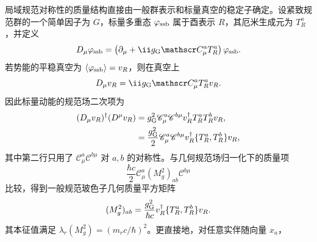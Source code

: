 局域规范对称性的质量结构直接由一般群表示和标量真空的稳定子确定。设紧致规范群的一个简单因子为 $G$，标量多重态 $\varphi_{\rm ssb}$ 属于酉表示 $R$，其厄米生成元为 $T_R^a$，并定义
\begin{equation}
 D_\mu\varphi_{\rm ssb}
 =\left(\partial_\mu+\ii g_{\rm G}\mathscr C_\mu^aT_R^a\right)\varphi_{\rm ssb}.
 \label{eq:general-ssb-covariant-derivative-dp73}
\end{equation}
若势能的平稳真空为 $\langle\varphi_{\rm ssb}\rangle=v_R$，则在真空上
\begin{equation*}
 D_\mu v_R=\ii g_{\rm G}\mathscr C_\mu^aT_R^av_R.
\end{equation*}
因此标量动能的规范场二次项为
\begin{align*}
 (D_\mu v_R)^\dagger(D^\mu v_R)
 &=g_{\rm G}^2\mathscr C_\mu^a\mathscr C^{b\mu}
 v_R^\dagger T_R^aT_R^bv_R,\\
 &=\frac{g_{\rm G}^2}{2}\mathscr C_\mu^a\mathscr C^{b\mu}
 v_R^\dagger\{T_R^a,T_R^b\}v_R,
\end{align*}
其中第二行只用了 $\mathscr C_\mu^a\mathscr C^{b\mu}$ 对 $a,b$ 的对称性。与几何规范场归一化下的质量项
\[
\frac{\hbar c}{2}\mathscr C_\mu^a(M_g^2)_{ab}\mathscr C^{b\mu}
\]
比较，得到一般规范玻色子几何质量平方矩阵
\begin{equation}
 {
 (M_g^2)_{ab}
 =\frac{g_{\rm G}^2}{\hbar c}
 v_R^\dagger\{T_R^a,T_R^b\}v_R.}
 \label{eq:general-gauge-boson-mass-matrix-dp11}
\end{equation}
其本征值满足 $\lambda_r(M_g^2)=(m_rc/\hbar)^2$。更直接地，对任意实伴随向量 $x_a$，


